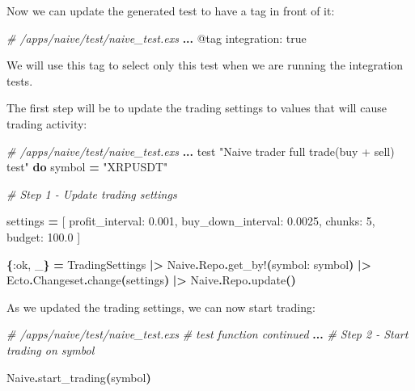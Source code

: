 \documentclass[
  oneside]{book}
\newenvironment{Shaded}{\begin{snugshade}}{\end{snugshade}}
\newcommand{\CommentTok}[1]{\textcolor[rgb]{0.56,0.35,0.01}{\textit{#1}}}
\newcommand{\ConstantTok}[1]{\textcolor[rgb]{0.56,0.35,0.01}{#1}}
\newcommand{\DecValTok}[1]{\textcolor[rgb]{0.00,0.00,0.81}{#1}}
\newcommand{\FloatTok}[1]{\textcolor[rgb]{0.00,0.00,0.81}{#1}}
\newcommand{\FunctionTok}[1]{\textcolor[rgb]{0.13,0.29,0.53}{\textbf{#1}}}
\newcommand{\KeywordTok}[1]{\textcolor[rgb]{0.13,0.29,0.53}{\textbf{#1}}}
\newcommand{\NormalTok}[1]{#1}
\newcommand{\OperatorTok}[1]{\textcolor[rgb]{0.81,0.36,0.00}{\textbf{#1}}}
\newcommand{\OtherTok}[1]{\textcolor[rgb]{0.56,0.35,0.01}{#1}}
\newcommand{\StringTok}[1]{\textcolor[rgb]{0.31,0.60,0.02}{#1}}
\newcommand{\VariableTok}[1]{\textcolor[rgb]{0.00,0.00,0.00}{#1}}
\begin{document}
\newpage

Now we can update the generated test to have a tag in front of it:

\begin{Shaded}
\begin{Highlighting}[]
  \CommentTok{\# /apps/naive/test/naive\_test.exs}
  \OperatorTok{...}
  \OtherTok{@tag} \VariableTok{integration:} \ConstantTok{true}
\end{Highlighting}
\end{Shaded}

We will use this tag to select only this test when we are running the integration tests.

The first step will be to update the trading settings to values that will cause trading activity:

\begin{Shaded}
\begin{Highlighting}[]
  \CommentTok{\# /apps/naive/test/naive\_test.exs}
  \OperatorTok{...}
\NormalTok{  test }\StringTok{"Naive trader full trade(buy + sell) test"} \KeywordTok{do}
\NormalTok{    symbol }\OperatorTok{=} \StringTok{"XRPUSDT"}

    \CommentTok{\# Step 1 {-} Update trading settings}

\NormalTok{    settings }\OperatorTok{=} \OtherTok{[}
      \VariableTok{profit\_interval:} \FloatTok{0.001}\NormalTok{,}
      \VariableTok{buy\_down\_interval:} \FloatTok{0.0025}\NormalTok{,}
      \VariableTok{chunks:} \DecValTok{5}\NormalTok{,}
      \VariableTok{budget:} \FloatTok{100.0}
    \OtherTok{]}

    \FunctionTok{\{}\VariableTok{:ok}\NormalTok{, \_}\FunctionTok{\}} \OperatorTok{=}
      \ConstantTok{TradingSettings}
      \OperatorTok{|\textgreater{}} \ConstantTok{Naive}\OperatorTok{.}\ConstantTok{Repo}\OperatorTok{.}\NormalTok{get\_by!}\FunctionTok{(}\VariableTok{symbol:}\NormalTok{ symbol}\FunctionTok{)}
      \OperatorTok{|\textgreater{}} \ConstantTok{Ecto}\OperatorTok{.}\ConstantTok{Changeset}\OperatorTok{.}\NormalTok{change}\FunctionTok{(}\NormalTok{settings}\FunctionTok{)}
      \OperatorTok{|\textgreater{}} \ConstantTok{Naive}\OperatorTok{.}\ConstantTok{Repo}\OperatorTok{.}\NormalTok{update}\FunctionTok{()}
\end{Highlighting}
\end{Shaded}

As we updated the trading settings, we can now start trading:

\begin{Shaded}
\begin{Highlighting}[]
    \CommentTok{\# /apps/naive/test/naive\_test.exs}
    \CommentTok{\# \textasciigrave{}test\textasciigrave{} function continued}
    \OperatorTok{...}
    \CommentTok{\# Step 2 {-} Start trading on symbol}

    \ConstantTok{Naive}\OperatorTok{.}\NormalTok{start\_trading}\FunctionTok{(}\NormalTok{symbol}\FunctionTok{)}
\end{Highlighting}
\end{Shaded}
\end{document}
